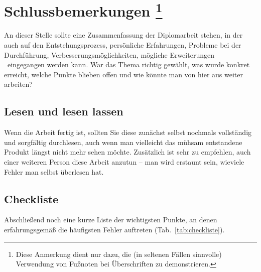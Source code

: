 \chapter[Schlussbemerkungen]%
        {Schlussbemerkungen%
        \protect\footnote{Diese Anmerkung dient nur dazu, die (in seltenen Fällen sinnvolle)
				Verwendung von Fußnoten bei Überschriften zu demonstrieren.}}%
\label{cha:Schluss}

An dieser Stelle sollte eine Zusammenfassung der Diplomarbeit
stehen, in der auch auf den Entstehungsprozess, persönliche
Erfahrungen, Probleme bei der Durchführung,
Verbesserungsmöglichkeiten, mögliche %
Erweiterungen \usw\ eingegangen werden kann. War das Thema richtig
gewählt, was wurde konkret erreicht, welche Punkte blieben offen
und wie könnte man von hier aus weiter arbeiten?


\section{Lesen und lesen lassen}

Wenn die Arbeit fertig ist, sollten Sie diese zunächst selbst nochmals vollständig und sorgfältig durchlesen, auch wenn man vielleicht das mühsam entstandene Produkt längst nicht mehr sehen möchte. Zusätzlich ist sehr zu empfehlen, auch einer weiteren Person diese Arbeit anzutun -- man wird erstaunt sein, wieviele Fehler man selbst überlesen hat. 



\section{Checkliste}

Abschließend noch eine kurze Liste der wichtigsten Punkte, an denen erfahrungsgemäß die häufigsten Fehler auftreten (Tab.\ \ref{tab:checkliste}).


